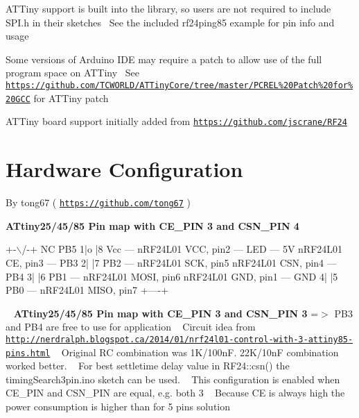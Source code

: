 A\+T\+Tiny support is built into the library, so users are not required to include S\+P\+I.\+h in their sketches~\newline
 See the included rf24ping85 example for pin info and usage

Some versions of Arduino I\+DE may require a patch to allow use of the full program space on A\+T\+Tiny~\newline
 See \href{https://github.com/TCWORLD/ATTinyCore/tree/master/PCREL%20Patch%20for%20GCC}{\tt https\+://github.\+com/\+T\+C\+W\+O\+R\+L\+D/\+A\+T\+Tiny\+Core/tree/master/\+P\+C\+R\+E\+L\%20\+Patch\%20for\%20\+G\+CC} for A\+T\+Tiny patch

A\+T\+Tiny board support initially added from \href{https://github.com/jscrane/RF24}{\tt https\+://github.\+com/jscrane/\+R\+F24}\hypertarget{ATTiny_Hardware}{}\section{Hardware Configuration}\label{ATTiny_Hardware}
By tong67 ( \href{https://github.com/tong67}{\tt https\+://github.\+com/tong67} )

{\bfseries A\+Ttiny25/45/85 Pin map with C\+E\+\_\+\+P\+IN 3 and C\+S\+N\+\_\+\+P\+IN 4} 
\begin{DoxyCode}
                             +-\(\backslash\)/-+
               NC      PB5  1|o   |8  Vcc --- nRF24L01  VCC, pin2 --- LED --- 5V
nRF24L01  CE, pin3 --- PB3  2|    |7  PB2 --- nRF24L01  SCK, pin5
nRF24L01 CSN, pin4 --- PB4  3|    |6  PB1 --- nRF24L01 MOSI, pin6
nRF24L01 GND, pin1 --- GND  4|    |5  PB0 --- nRF24L01 MISO, pin7
                             +----+ 
\end{DoxyCode}


~\newline
 {\bfseries A\+Ttiny25/45/85 Pin map with C\+E\+\_\+\+P\+IN 3 and C\+S\+N\+\_\+\+P\+IN 3} =$>$ P\+B3 and P\+B4 are free to use for application ~\newline
 Circuit idea from \href{http://nerdralph.blogspot.ca/2014/01/nrf24l01-control-with-3-attiny85-pins.html}{\tt http\+://nerdralph.\+blogspot.\+ca/2014/01/nrf24l01-\/control-\/with-\/3-\/attiny85-\/pins.\+html} ~\newline
 Original RC combination was 1\+K/100nF. 22\+K/10nF combination worked better. ~\newline
 For best settletime delay value in R\+F24\+::csn() the timing\+Search3pin.\+ino sketch can be used. ~\newline
 This configuration is enabled when C\+E\+\_\+\+P\+IN and C\+S\+N\+\_\+\+P\+IN are equal, e.\+g. both 3 ~\newline
 Because CE is always high the power consumption is higher than for 5 pins solution ~\newline
 
